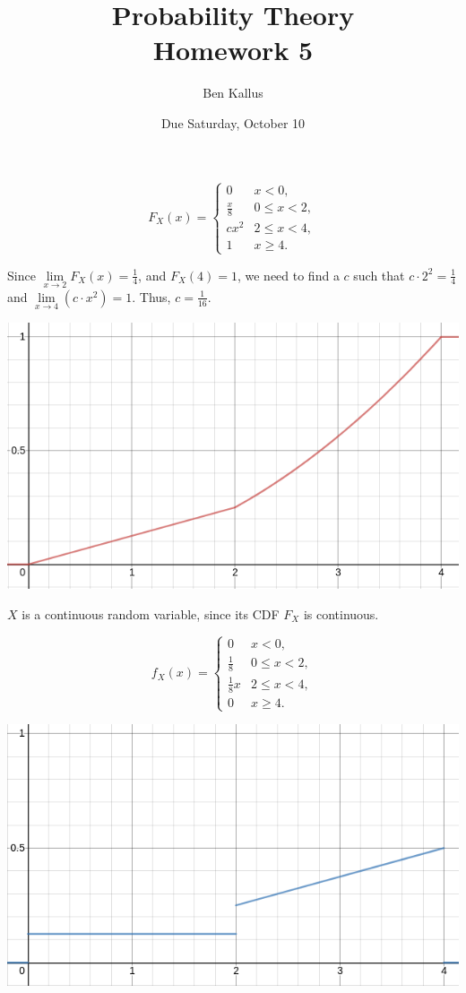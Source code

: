 \documentclass[12pt]{article}
\title{Probability Theory \\ Homework 5}
\author{Ben Kallus}
\date{Due Saturday, October 10}
\begin{document}
\maketitle

$$F_X(x) =
\begin{cases}
    0 & x < 0, \\
    \frac x8 & 0 \leq x < 2, \\
    cx^2 & 2 \leq x < 4, \\
    1 & x \geq 4.
\end{cases}$$

\medskip
{} Since $\lim\limits_{x \to 2} F_X(x) = \frac14$, and $F_X(4) = 1$, we need to find a $c$ such that $c\cdot 2^2 = \frac14$ and $\lim\limits_{x \to 4}(c \cdot x^2) = 1$. Thus,
    $c = \frac1{16}.$
    
\medskip
{}
    \begin{center}\includegraphics[scale=.6]{capture.png}\end{center}

    $X$ is a continuous random variable, since its CDF $F_X$ is continuous.
    
\newpage
{}
    $$f_X(x) =
        \begin{cases}
            0 & x < 0, \\
            \frac18 & 0 \leq x < 2, \\
            \frac18x & 2 \leq x < 4, \\
            0 & x \geq 4.
        \end{cases}$$
        
    \begin{center}\includegraphics[scale=.6]{capture2.png}\end{center}
    
\end{document}
